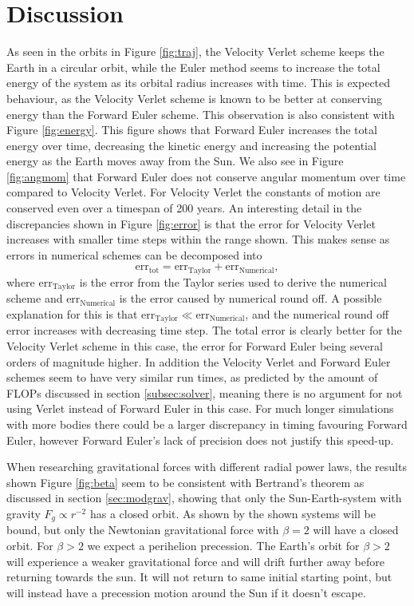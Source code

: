 \documentclass[twocolumn]{aastex62}
\begin{document}
\section{Discussion} \label{sec:discussion}
As seen in the orbits in Figure \ref{fig:traj}, the Velocity Verlet scheme 
keeps the Earth in a circular orbit, while the Euler method seems to 
increase the total energy of the system as its orbital radius increases 
with time. This is expected behaviour, as the Velocity Verlet scheme is known to be better
at conserving energy than the Forward Euler scheme. This observation is also consistent with 
Figure \ref{fig:energy}. This figure shows that Forward Euler increases the total energy over time, decreasing the kinetic energy
and increasing the potential energy as the Earth moves away from the Sun. 
We also see in Figure \ref{fig:angmom} that Forward Euler does not conserve angular 
momentum over time compared to Velocity Verlet. For Velocity Verlet the constants of motion are conserved even over a timespan of 200 years. 
An interesting detail in the discrepancies shown in Figure \ref{fig:error}
is that the error for Velocity Verlet increases with smaller time steps within the range 
shown. This makes sense as errors in numerical schemes can be decomposed 
into \begin{equation}
\mathrm{err}_\mathrm{tot}=\mathrm{err}_\mathrm{Taylor} + \mathrm{err}_
\mathrm{Numerical}, \label{eq:error_decomp}
\end{equation} where $\mathrm{err}_\mathrm{Taylor}$ is the error from the 
Taylor series used to derive the numerical scheme and $\mathrm{err}_
\mathrm{Numerical}$ is the error caused by numerical round off. A 
possible explanation for this is that
$\mathrm{err}_\mathrm{Taylor} \ll \mathrm{err}_\mathrm{Numerical}$, 
and the numerical round off error increases with decreasing time step. 
The total error is clearly better for the Velocity Verlet scheme in 
this case, the error for Forward Euler being several orders of magnitude 
higher. In addition the Velocity Verlet and Forward Euler schemes seem to have 
very similar run times, as predicted by the amount of FLOPs discussed in section \ref{subsec:solver}, meaning there is no argument for not using 
Verlet instead of Forward Euler in this case. For 
much longer simulations with more bodies there could be a larger discrepancy in timing favouring Forward Euler, however Forward Euler's lack of precision does not justify this speed-up.

When researching gravitational forces with different radial power laws, 
the results shown Figure \ref{fig:beta} seem to be consistent with 
Bertrand's theorem as discussed in section \ref{sec:modgrav}, 
showing that only the Sun-Earth-system with gravity $F_g\propto r^{-2}$ 
has a closed orbit. As shown by \cite{ray:2004} the shown systems will 
be bound, but only the Newtonian gravitational force with $\beta=2$ will 
have a closed orbit. For $\beta>2$ we expect a perihelion precession. 
The Earth's orbit for $\beta>2$ will experience a  
weaker gravitational force and will drift further away before returning 
towards the sun. It will not return to same initial starting point, but 
will instead have a precession motion around the Sun if it doesn't 
escape. 
\end{document}
